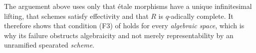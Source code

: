 \begin{remark}\label{rl-000J}\label{rmk:effectivity-for-algebraic-spaces}
  The arguement above uses only that \'etale morphisms have a unique infinitesimal lifting, that schemes satisfy effectivity and that \(R\) is \(q\)-adically complete. It therefore shows that condition (F3) of \cite[Theorem 2.3.1]{romagny_AlgebraicitySmoothnessFixed2022} holds for every \emph{algebraic space}, which is why its failure obstructs algebraicity and not merely representability by an unramified spearated \emph{scheme}.
\end{remark}
